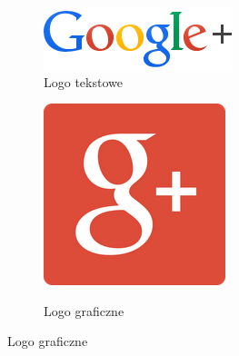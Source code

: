 \begin{figure}[!h]
\centering
\begin{subfigure}{.5\textwidth}
  \centering
  \includegraphics[width=.4\linewidth]{images/googleplus_color.png}
  \caption{Logo tekstowe}
  \label{fig:google-logo-tekstowe}
\end{subfigure}%
\begin{subfigure}{.5\textwidth}
  \centering
  \scalebox{0.7}
  {
      \includegraphics[width=.4\linewidth]{images/google-plus-logo.png}
  }  
  \caption{Logo graficzne}
  \label{fig:google-logo-graficzne}
\end{subfigure}
\label{fig:logo-google}
\end{figure}

\lipsum[30-33]

\
